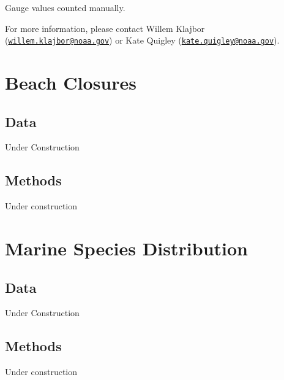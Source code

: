 \documentclass[
]{book}
\begin{document}
Gauge values counted manually.

For more information, please contact Willem Klajbor (\href{mailto:willem.klajbor@noaa.gov}{\nolinkurl{willem.klajbor@noaa.gov}}) or Kate Quigley (\href{mailto:kate.quigley@noaa.gov}{\nolinkurl{kate.quigley@noaa.gov}}).

\hypertarget{beach-closures}{%
\chapter{Beach Closures}\label{beach-closures}}

\hypertarget{data-22}{%
\section{Data}\label{data-22}}

Under Construction

\hypertarget{methods-22}{%
\section{Methods}\label{methods-22}}

Under construction

\hypertarget{marine-species-distribution}{%
\chapter{Marine Species Distribution}\label{marine-species-distribution}}

\hypertarget{data-23}{%
\section{Data}\label{data-23}}

Under Construction

\hypertarget{methods-23}{%
\section{Methods}\label{methods-23}}

Under construction

  
\end{document}
